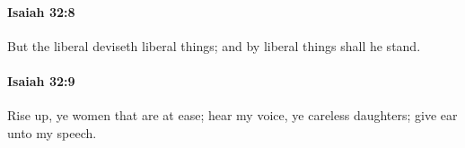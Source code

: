 		\paragraph{Isaiah 32:8} %
			\label{ISAIAH-32-8}

			But the liberal deviseth liberal things; and by liberal things shall he stand.


		\paragraph{Isaiah 32:9} %
			\label{ISAIAH-32-9}

			Rise up, ye women that are at ease; hear my voice, ye careless daughters; give ear unto my speech.


